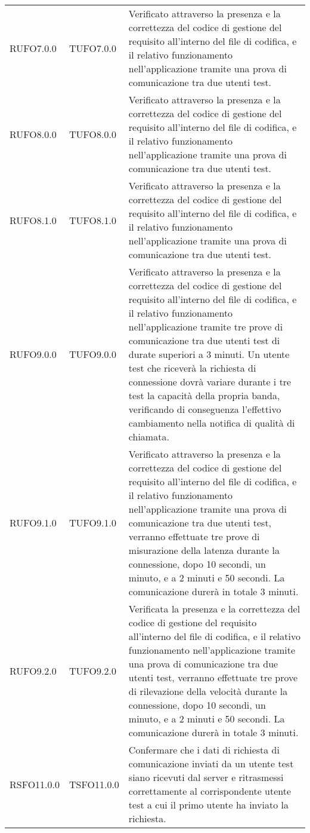 \begin{center}
\begin{longtable}{llp{}}
RUFO7.0.0 & TUFO7.0.0& Verificato attraverso la presenza e la correttezza del codice di gestione del requisito all'interno del file di codifica, e il relativo funzionamento nell'applicazione tramite una prova di comunicazione tra due utenti test.\\
RUFO8.0.0 & TUFO8.0.0& Verificato attraverso la presenza e la correttezza del codice di gestione del requisito all'interno del file di codifica, e il relativo funzionamento nell'applicazione tramite una prova di comunicazione tra due utenti test.\\
RUFO8.1.0 & TUFO8.1.0& Verificato attraverso la presenza e la correttezza del codice di gestione del requisito all'interno del file di codifica, e il relativo funzionamento nell'applicazione tramite una prova di comunicazione tra due utenti test.\\
RUFO9.0.0 & TUFO9.0.0& Verificato attraverso la presenza e la correttezza del codice di gestione del requisito all'interno del file di codifica, e il relativo funzionamento nell'applicazione tramite tre prove di comunicazione tra due utenti test di durate superiori a 3 minuti. Un utente test che riceverà la richiesta di connessione dovrà variare durante i tre test la capacità della propria banda, verificando di conseguenza l'effettivo cambiamento nella notifica di qualità di chiamata. \\
RUFO9.1.0 & TUFO9.1.0& Verificato attraverso la presenza e la correttezza del codice di gestione del requisito all'interno del file di codifica, e il relativo funzionamento nell'applicazione tramite una prova di comunicazione tra due utenti test, verranno effettuate tre prove di misurazione della latenza durante la connessione, dopo 10 secondi, un minuto, e a 2 minuti e 50 secondi. La comunicazione durerà in totale 3 minuti.\\
RUFO9.2.0 & TUFO9.2.0& Verificata la presenza e la correttezza del codice di gestione del requisito all'interno del file di codifica, e il relativo funzionamento nell'applicazione tramite una prova di comunicazione tra due utenti test, verranno effettuate tre prove di rilevazione della velocità durante la connessione, dopo 10 secondi, un minuto, e a 2 minuti e 50 secondi. La comunicazione durerà in totale 3 minuti.\\
RSFO11.0.0 & TSFO11.0.0& Confermare che i dati di richiesta di comunicazione inviati da un utente test siano ricevuti dal server e ritrasmessi correttamente al corrispondente utente test a cui il primo utente ha inviato la richiesta.\\

\end{longtable}
\end{center}
